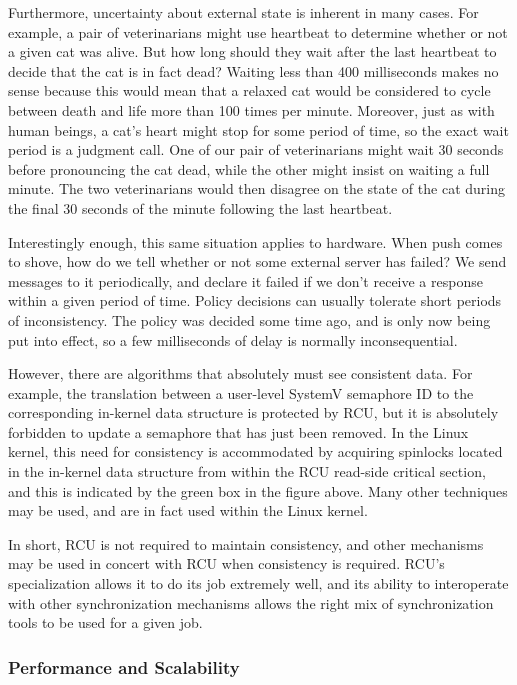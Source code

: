 Furthermore, uncertainty about external state is inherent in many cases.
For example, a pair of veterinarians might use heartbeat to determine
whether or not a given cat was alive.
But how long should they wait
after the last heartbeat to decide that the cat is in fact dead?
Waiting
less than 400 milliseconds makes no sense because this would mean that a
relaxed cat would be considered to cycle between death and life more
than 100 times per minute.
Moreover, just as with human beings, a cat's
heart might stop for some period of time, so the exact wait period is a
judgment call.
One of our pair of veterinarians might wait 30 seconds
before pronouncing the cat dead, while the other might insist on waiting
a full minute.
The two veterinarians would then disagree on the state of
the cat during the final 30 seconds of the minute following the last
heartbeat.

Interestingly enough, this same situation applies to hardware.
When push
comes to shove, how do we tell whether or not some external server has
failed?
We send messages to it periodically, and declare it failed if we
don't receive a response within a given period of time.
Policy decisions
can usually tolerate short periods of inconsistency.
The policy was
decided some time ago, and is only now being put into effect, so a few
milliseconds of delay is normally inconsequential.

However, there are algorithms that absolutely must see consistent data.
For example, the translation between a user-level SystemV semaphore ID
to the corresponding in-kernel data structure is protected by RCU, but
it is absolutely forbidden to update a semaphore that has just been
removed.
In the Linux kernel, this need for consistency is accommodated
by acquiring spinlocks located in the in-kernel data structure from
within the RCU read-side critical section, and this is indicated by the
green box in the figure above. Many other techniques may be used, and
are in fact used within the Linux kernel.

In short, RCU is not required to maintain consistency, and other
mechanisms may be used in concert with RCU when consistency is required.
RCU's specialization allows it to do its job extremely well, and its
ability to interoperate with other synchronization mechanisms allows the
right mix of synchronization tools to be used for a given job.


\subsubsection{Performance and Scalability}

